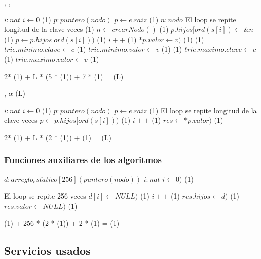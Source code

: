 {   ,
    ,
    }
{}{}
{
	\var $i : nat$
	\State $ i \gets 0$  												\comment \bigo(1)
	\var $p : puntero(nodo)$
	\State $ p \gets e.raiz$											\comment \bigo(1)
	\var $n : nodo$
   		\Statex             \comment El loop se repite longitud de la clave veces
     	                      			\comment \bigo(1)
            \State $n \gets crearNodo()$      							\comment \bigo(1)
           	\State $p.hijos[ord(s[i]) \gets \&n$              			\comment \bigo(1)
     	 \EndIf
     	\State $p \gets p.hijos[ord(s[i]))$								\comment \bigo(1)
     	\State $i++$   													\comment \bigo(1)
    \EndWhile
	\State $*p.valor \gets v)$										\comment \bigo(1)
                         					\comment \bigo(1)
           \State $trie.minimo.clave \gets c$     				 	\comment \bigo(1)
             \State $trie.minimo.valor \gets v$     				 \comment \bigo(1)
       \EndIf
                          					\comment \bigo(1)
           \State $trie.maximo.clave \gets c$     				 	\comment \bigo(1)
           \State $trie.maximo.valor \gets v$     				 	\comment \bigo(1)
      \EndIf

}	{  2* \bigo(1) + L * (5 * \bigo(1)) + 7 * \bigo(1) = \bigo(L) }

{   ,
    }
    {$\alpha$}
    {\bigo(L)}
{
	\var $i : nat$
	\State $ i \gets 0$  												\comment \bigo(1)
	\var $p : puntero(nodo)$
	\State $ p \gets e.raiz$											\comment \bigo(1)
     	\Statex             \comment El loop se repite longitud de la clave veces
     	\State $p \gets p.hijos[ord(s[i]))$								\comment \bigo(1)
     	\State $i++$   													\comment \bigo(1)
    \EndWhile
	\State $res \gets *p.valor)$										\comment \bigo(1)

}	{  2* \bigo(1) + L * (2 * \bigo(1)) + \bigo(1) = \bigo(L) }



\subsubsection{Funciones auxiliares de los algoritmos}

  {
    \var $d : arreglo_est\acute{a}tico[256] (puntero(nodo))$
    \var $i : nat$
    \State $i \gets 0)$                									\comment \bigo(1)

     	\Statex             \comment El loop se repite 256 veces
     	\State $d[i] \gets NULL)$										\comment \bigo(1)
     	\State $i++$   													\comment \bigo(1)
    \EndWhile
    \State $res.hijos \gets d)$											\comment \bigo(1)
    \State $res.valor \gets NULL)$   									\comment \bigo(1)
}{   \bigo(1) + 256 * (2 * \bigo(1)) + 2 * \bigo(1) = \bigo(1) }

\subsection{Servicios usados}
